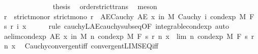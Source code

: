 \begin{isabellebody}
\ \ \isanewline
\ \ \ \ \isamarkupfalse%
\isanewline
\ \ \ \ \isamarkupfalse%
\ \isamarkupfalse%
\ {\isacharquery}{\kern0pt}thesis\ \isamarkupfalse%
\ order{\isachardot}{\kern0pt}strict{\isacharunderscore}{\kern0pt}trans{}\ \isamarkupfalse%
\ meson\isanewline
\ \ \isamarkupfalse%
\isanewline
\ \ \isamarkupfalse%
\ \isamarkupfalse%
\ r\ \ strict{\isacharunderscore}{\kern0pt}mono{\isacharunderscore}{\kern0pt}r{\isacharcolon}{\kern0pt}\ {\isachardoublequoteopen}strict{\isacharunderscore}{\kern0pt}mono\ r{\isachardoublequoteclose}\ \ AE{\isacharunderscore}{\kern0pt}Cauchy{\isacharcolon}{\kern0pt}\ {\isachardoublequoteopen}AE\ x\ in\ M{\isachardot}{\kern0pt}\ Cauchy\ {\isacharparenleft}{\kern0pt}{\isasymlambda}i{\isachardot}{\kern0pt}\ cond{\isacharunderscore}{\kern0pt}exp\ M\ F\ {\isacharparenleft}{\kern0pt}s\ {\isacharparenleft}{\kern0pt}r\ i{\isacharparenright}{\kern0pt}{\isacharparenright}{\kern0pt}\ x{\isacharparenright}{\kern0pt}{\isachardoublequoteclose}\isanewline
\ \ \ \ \isamarkupfalse%
\ {\isacharparenleft}{\kern0pt}rule\ cauchy{\isacharunderscore}{\kern0pt}L{}{\isacharunderscore}{\kern0pt}AE{\isacharunderscore}{\kern0pt}cauchy{\isacharunderscore}{\kern0pt}subseq{\isacharbrackleft}{\kern0pt}OF\ integrable{\isacharunderscore}{\kern0pt}cond{\isacharunderscore}{\kern0pt}exp{\isacharbrackright}{\kern0pt}{\isacharcomma}{\kern0pt}\ auto{\isacharparenright}{\kern0pt}\isanewline
\ \ \isamarkupfalse%
\ ae{\isacharunderscore}{\kern0pt}lim{\isacharunderscore}{\kern0pt}cond{\isacharunderscore}{\kern0pt}exp{\isacharcolon}{\kern0pt}\ {\isachardoublequoteopen}AE\ x\ in\ M{\isachardot}{\kern0pt}\ {\isacharparenleft}{\kern0pt}{\isasymlambda}n{\isachardot}{\kern0pt}\ cond{\isacharunderscore}{\kern0pt}exp\ M\ F\ {\isacharparenleft}{\kern0pt}s\ {\isacharparenleft}{\kern0pt}r\ n{\isacharparenright}{\kern0pt}{\isacharparenright}{\kern0pt}\ x{\isacharparenright}{\kern0pt}\ {\isasymlonglonglongrightarrow}\ lim\ {\isacharparenleft}{\kern0pt}{\isasymlambda}n{\isachardot}{\kern0pt}\ cond{\isacharunderscore}{\kern0pt}exp\ M\ F\ {\isacharparenleft}{\kern0pt}s\ {\isacharparenleft}{\kern0pt}r\ n{\isacharparenright}{\kern0pt}{\isacharparenright}{\kern0pt}\ x{\isacharparenright}{\kern0pt}{\isachardoublequoteclose}\ \isamarkupfalse%
\ Cauchy{\isacharunderscore}{\kern0pt}convergent{\isacharunderscore}{\kern0pt}iff\ convergent{\isacharunderscore}{\kern0pt}LIMSEQ{\isacharunderscore}{\kern0pt}iff\ \isamarkupfalse%

\end{isabellebody}

